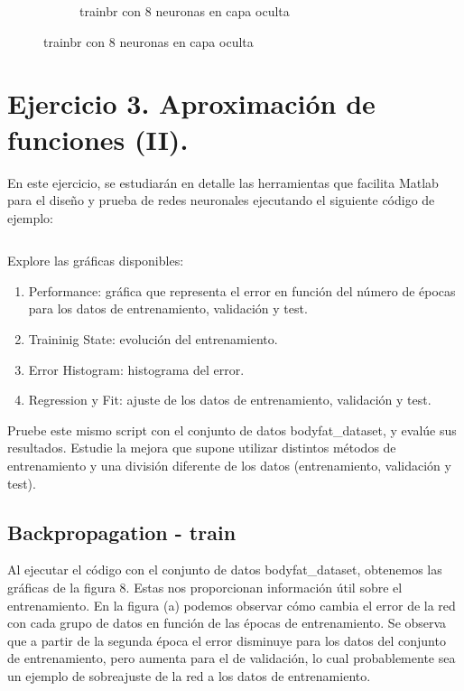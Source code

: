 \documentclass[a4paper, 12pt]{article}
\begin{document}
\begin{figure}[htp!]
\begin{subfigure}{0.49\textwidth}
                        \caption{trainbr con 8 neuronas en capa oculta}
                    \end{subfigure}
                \end{figure}

 
        \newpage
        \section{Ejercicio 3. Aproximación de funciones (II).}
            En este ejercicio, se estudiarán en detalle las herramientas que facilita Matlab para el diseño y prueba de redes neuronales ejecutando el siguiente código de ejemplo:

            \inputminted[fontsize=\scriptsize, linenos, breaklines=true, xleftmargin=0.75cm, frame=lines]{matlab}{code/parte1/Ej3.m}

            Explore las gráficas disponibles:
            \begin{enumerate}
                \item Performance: gráfica que representa el error en función del número de épocas para los datos de entrenamiento, validación y test.
                \item Traininig State: evolución del entrenamiento.
                \item Error Histogram: histograma del error.
                \item Regression y Fit: ajuste de los datos de entrenamiento, validación y test.
            \end{enumerate}

            Pruebe este mismo script con el conjunto de datos bodyfat\_dataset, y evalúe sus resultados. Estudie la mejora que supone utilizar distintos métodos de entrenamiento y una división diferente de los datos (entrenamiento, validación y test).

            \newpage
            \subsection{Backpropagation - train}

                Al ejecutar el código con el conjunto de datos bodyfat\_dataset, obtenemos las gráficas de la figura 8. Estas nos proporcionan información útil sobre el entrenamiento. 
                En la figura (a) podemos observar cómo cambia el error de la red con cada grupo de datos en función de las épocas de entrenamiento. Se observa que a partir de la segunda época el error disminuye para los datos del conjunto de entrenamiento, pero aumenta para el de validación, lo cual probablemente sea un ejemplo de sobreajuste de la red a los datos de entrenamiento.
\end{document}
